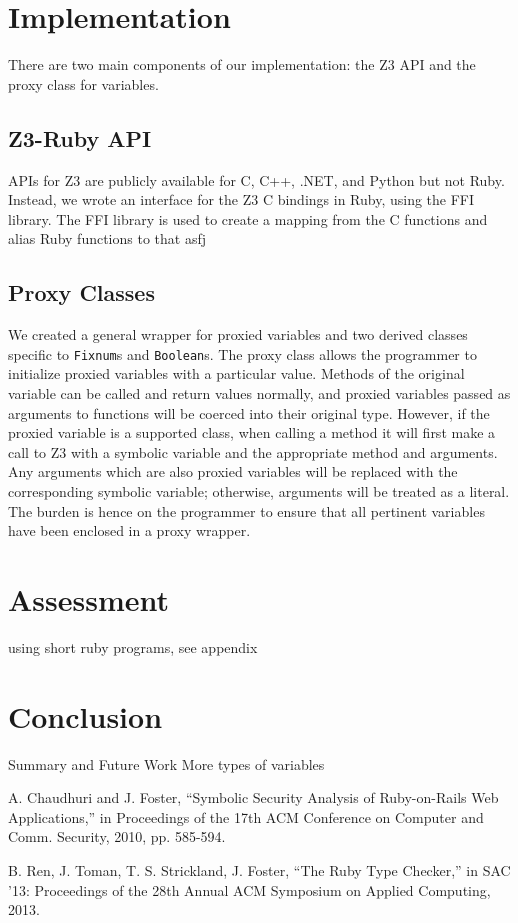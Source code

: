 \documentclass[10pt]{article}
\begin{document}
\section{Implementation}
There are two main components of our implementation: the Z3 API and the proxy class for variables.\\

\subsection{Z3-Ruby API}
APIs for Z3 are publicly available for C, C++, .NET, and Python \textemdash but not Ruby.  Instead, we wrote an interface for the Z3 C bindings in Ruby, using the FFI library.  The FFI library is used to create a mapping from the C functions and alias Ruby functions to that asfj

\subsection{Proxy Classes}
We created a general wrapper for proxied variables and two derived classes specific to \texttt{Fixnum}s and \texttt{Boolean}s.  The proxy class allows the programmer to initialize proxied variables with a particular value.  Methods of the original variable can be called and return values normally, and proxied variables passed as arguments to functions will be coerced into their original type.  However, if the proxied variable is a supported class, when calling a method it will first make a call to Z3 with a symbolic variable and the appropriate method and arguments.  Any arguments which are also proxied variables will be replaced with the corresponding symbolic variable; otherwise, arguments will be treated as a literal.  The burden is hence on the programmer to ensure that all pertinent variables have been enclosed in a proxy wrapper.\\

\section{Assessment}
using short ruby programs, see appendix

\section{Conclusion}
Summary and Future Work
More types of variables

\begin{thebibliography}{99}
A. Chaudhuri and J. Foster, ``Symbolic Security Analysis of Ruby-on-Rails Web Applications,'' in Proceedings of the 17th ACM Conference on Computer and Comm. Security, 2010, pp. 585-594.

B. Ren, J. Toman, T. S. Strickland, J. Foster, ``The Ruby Type Checker,'' in SAC '13: Proceedings of the 28th Annual ACM Symposium on Applied Computing, 2013.

\end{thebibliography}
\end{document}
